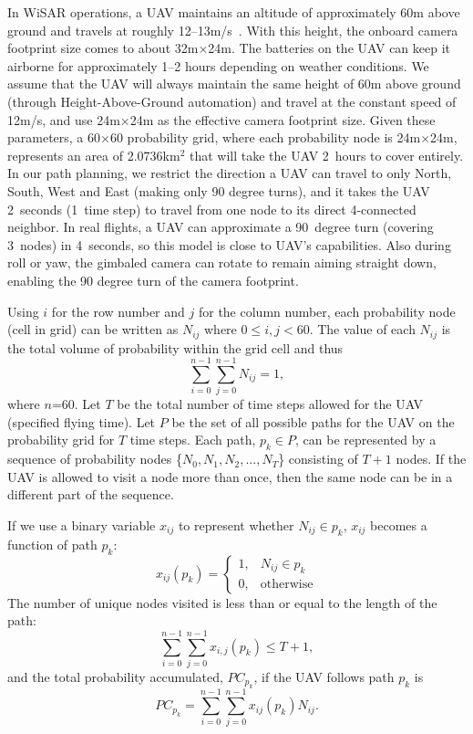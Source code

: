 In WiSAR operations, a UAV maintains an altitude of approximately 60m above ground and travels at roughly 12--13m/s~\cite{Goodrich2008Supporting}. With this height, the onboard camera footprint size comes to about 32m$\times$24m. The batteries on the UAV can keep it airborne for approximately 1--2 hours depending on weather conditions. We assume that the UAV will always maintain the same height of 60m above ground (through Height-Above-Ground automation) and travel at the constant speed of 12m/s, and use 24m$\times$24m as the effective camera footprint size. Given these parameters, a 60$\times$60 probability grid, where each probability node is 24m$\times$24m, represents an area of 2.0736km$^2$ that will take the UAV 2~hours to cover entirely. In our path planning, we restrict the direction a UAV can travel to only North, South, West and East (making only 90 degree turns), and it takes the UAV 2~seconds (1~time step) to travel from one node to its direct 4-connected neighbor. In real flights, a UAV can approximate a 90~degree turn (covering 3~nodes) in 4~seconds, so this model is close to UAV's capabilities. Also during roll or yaw, the gimbaled camera can rotate to remain aiming straight down, enabling the 90 degree turn of the camera footprint.

Using $i$ for the row number and $j$ for the column number, each probability node (cell in grid) can be written as $N_{ij}$ where $0{\leq}i,j{<}60$. The value of each $N_{ij}$ is the total volume of probability within the grid cell and thus
\begin{equation}
\sum_{i=0}^{n-1}\sum_{j=0}^{n-1}N_{ij} = 1,
\label{4totalP}
\end{equation}
where $n$=60. Let $T$ be the total number of time steps allowed for the UAV (specified flying time). Let $P$ be the set of all possible paths for the UAV on the probability grid for $T$ time steps. Each path, $p_{k} \!{\in} P$, can be represented by a sequence of probability nodes \{$N_{0},N_{1},N_{2},...,N_{T}$\} consisting of $T\!{+}1$ nodes. If the UAV is allowed to visit a node more than once, then the same node can be in a different part of the sequence.

If we use a binary variable $x_{ij}$ to represent whether $N_{ij} \!{\in} p_{k}$, $x_{ij}$ becomes a function of path $p_{k}$: 
\begin{equation}
x_{ij}(p_{k}) = 
	\left\{
	\begin{array}{cl}
		1, & N_{ij} \in p_{k} \\
		0, & \mbox{otherwise}
	\end{array}
	\right.
\label{inpath function}
\end{equation}
The number of unique nodes visited is less than or equal to the length of the path:
\begin{equation}
\sum_{i=0}^{n-1}\sum_{j=0}^{n-1}x_{i,j}(p_{k}) \leq T + 1,
\end{equation}
and the total probability accumulated, $PC_{p_{k}}$, if the UAV follows path $p_{k}$ is
\begin{equation}
PC_{p_{k}}=\sum_{i=0}^{n-1}\sum_{j=0}^{n-1}x_{ij}(p_{k})N_{ij}.
\label{pathk}
\end{equation}

